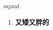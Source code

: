 
\begin{frame}
{\huge squat}
\begin{center}
\begin{enumerate}\Large
  \item \textbf{又矮又胖的}
\end{enumerate}
\end{center}
\end{frame}
